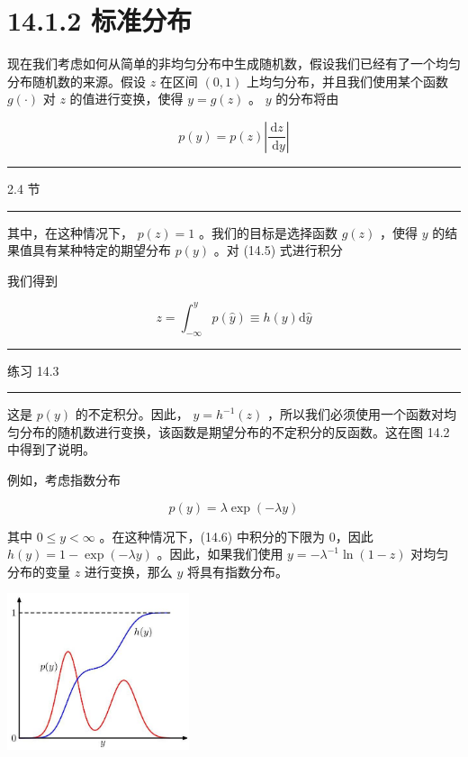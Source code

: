\documentclass[10pt]{article}
\newcommand{\HRule}{\begin{center}\rule{0.9\linewidth}{0.2mm}\end{center}}
\begin{document}
\section*{14.1.2 标准分布}

现在我们考虑如何从简单的非均匀分布中生成随机数，假设我们已经有了一个均匀分布随机数的来源。假设 \(z\) 在区间 \(\left( {0,1}\right)\) 上均匀分布，并且我们使用某个函数 \(g\left( \cdot \right)\) 对 \(z\) 的值进行变换，使得 \(y = g\left( z\right)\) 。 \(y\) 的分布将由

\[
p\left( y\right)  = p\left( z\right) \left| \frac{\mathrm{d}z}{\mathrm{\;d}y}\right|  \tag{14.5}
\]

\HRule

2.4 节

\HRule

其中，在这种情况下， \(p\left( z\right)  = 1\) 。我们的目标是选择函数 \(g\left( z\right)\) ，使得 \(y\) 的结果值具有某种特定的期望分布 \(p\left( y\right)\) 。对 (14.5) 式进行积分

我们得到

\[
z = {\int }_{-\infty }^{y}p\left( \widehat{y}\right)  \equiv  h\left( y\right) \mathrm{d}\widehat{y} \tag{14.6}
\]

\HRule

练习 14.3

\HRule

这是 \(p\left( y\right)\) 的不定积分。因此， \(y = {h}^{-1}\left( z\right)\) ，所以我们必须使用一个函数对均匀分布的随机数进行变换，该函数是期望分布的不定积分的反函数。这在图 14.2 中得到了说明。

例如，考虑指数分布

\[
p\left( y\right)  = \lambda \exp \left( {-{\lambda y}}\right)  \tag{14.7}
\]

其中 \(0 \leq  y < \infty\) 。在这种情况下，(14.6) 中积分的下限为 0，因此 \(h\left( y\right)  = 1 - \exp \left( {-{\lambda y}}\right)\) 。因此，如果我们使用 \(y =  - {\lambda }^{-1}\ln \left( {1 - z}\right)\) 对均匀分布的变量 \(z\) 进行变换，那么 \(y\) 将具有指数分布。

\begin{center}
\includegraphics[max width=0.4\textwidth]{images/0194e279-9b28-703a-88f4-c3ac21e2010d_451_993_343_559_481_0.jpg}
\end{center}
\hspace*{3em} 
\end{document}
